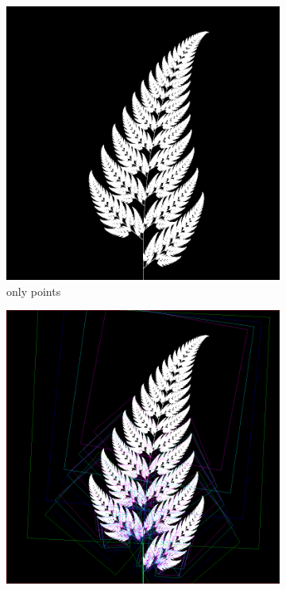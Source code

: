 \documentclass[11pt]{article}
\begin{document}
\begin{figure}
     \centering
     \begin{subfigure}[b]{0.3\textwidth}
         \centering
         \includegraphics[width=\textwidth]{figures/barnsley_points}
         \caption{only points}
         \label{figure:barnsley_guides}
     \end{subfigure}
     \hfill
     \begin{subfigure}[b]{0.3\textwidth}
         \centering
         \includegraphics[width=\textwidth]{figures/barnsley_guides_and_points}

\end{subfigure}
\end{figure}
\end{document}
